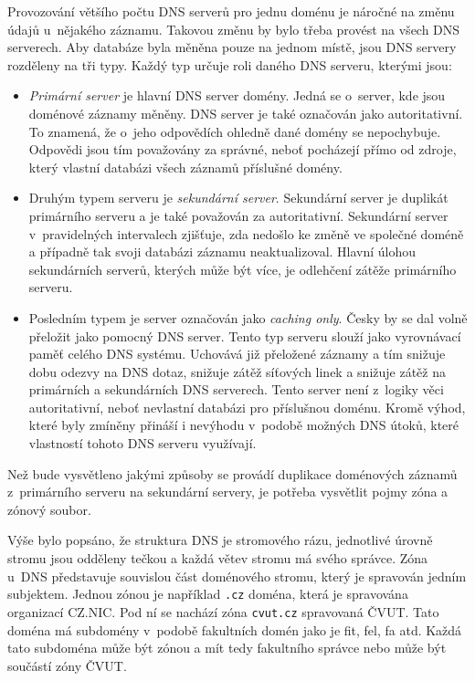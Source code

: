 \documentclass[thesis=M,czech]{src/FITthesis}[2019/12/23]
\begin{document}
Provozování většího počtu DNS serverů pro jednu doménu je náročné na změnu údajů u~nějakého záznamu. Takovou změnu by bylo třeba provést na všech DNS serverech. Aby databáze byla měněna pouze na jednom místě, jsou DNS servery rozděleny na tři typy. Každý typ určuje roli daného DNS serveru, kterými jsou: 

\begin{itemize}
	\item \textit{Primární server} je hlavní DNS server domény. Jedná se o~server, kde jsou doménové záznamy měněny. DNS server je také označován jako autoritativní. To znamená, že o~jeho odpovědích ohledně dané domény se nepochybuje. Odpovědi jsou tím považovány za správné, neboť pocházejí přímo od zdroje, který vlastní databázi všech záznamů příslušné domény. 
	\item Druhým typem serveru je \textit{sekundární server}. Sekundární server je duplikát primárního serveru a je také považován za autoritativní. \linebreak Sekundární server v~pravidelných intervalech zjišťuje, zda nedošlo ke změně ve společné doméně a případně tak svoji databázi záznamu neaktualizoval. Hlavní úlohou sekundárních serverů, kterých může být více, je odlehčení zátěže primárního serveru. 
	
	 \item Posledním typem je server označován jako \textit{caching only}. Česky by se dal volně přeložit jako pomocný DNS server. Tento typ serveru slouží jako vyrovnávací paměť celého DNS systému. Uchovává již přeložené záznamy a tím snižuje dobu odezvy na DNS dotaz, snižuje zátěž síťových linek a snižuje zátěž na primárních a sekundárních DNS serverech. Tento server není z~logiky věci autoritativní, neboť nevlastní databázi pro příslušnou doménu.  Kromě výhod, které byly zmíněny přináší i nevýhodu v~podobě možných DNS útoků, které vlastností tohoto DNS serveru využívají. \cite{RFC1035, RFC8499}
	 
	 
\end{itemize} 

Než bude vysvětleno jakými způsoby se provádí duplikace doménových záznamů z~primárního serveru na sekundární servery, je potřeba vysvětlit pojmy zóna a zónový soubor. 

Výše bylo popsáno, že struktura DNS je stromového rázu, jednotlivé úrovně stromu jsou odděleny tečkou a každá větev stromu má svého správce. Zóna u~DNS představuje souvislou část doménového stromu, který je spravován jedním subjektem. Jednou zónou je například \texttt{.cz} doména, která je spravována organizací CZ.NIC. Pod ní se nachází zóna \texttt{cvut.cz} spravovaná ČVUT. Tato doména má subdomény v~podobě fakultních domén jako je fit, fel, fa atd. Každá tato subdoména může být zónou a mít tedy fakultního správce nebo může být součástí zóny ČVUT. 
\end{document}
